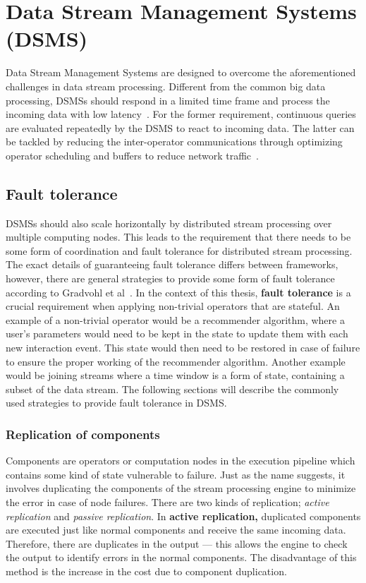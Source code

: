 \section{Data Stream Management Systems (DSMS)} 
Data Stream Management Systems are designed to overcome the aforementioned challenges 
in data stream processing. Different from the common big data processing, DSMSs should
respond in a limited time frame and process the incoming data with low latency~\cite{data_stream_management}. 
For the former requirement, continuous queries are evaluated repeatedly by the DSMS to react 
to incoming data. The latter can be tackled by reducing the inter-operator communications 
through optimizing operator scheduling and buffers to reduce network traffic~\cite{low_latency_data_stream}. 



\subsection{Fault tolerance}
DSMSs should also scale horizontally 
by distributed stream processing over multiple computing nodes. 
This leads to the requirement that there needs to be some form of coordination and fault tolerance 
for distributed stream processing. The exact details of guaranteeing fault tolerance differs between frameworks, however, there are general strategies to provide some 
form of fault tolerance according to Gradvohl et al~\cite{fault_tolerance_dsms}.
In the context of this thesis, \textbf{fault tolerance} is a crucial requirement when applying
non-trivial operators that are stateful. 
An example of a non-trivial operator would be a recommender algorithm, where 
a user's parameters would need to be kept in the state to update them with each new 
interaction event. This state would then need to be restored in case of failure to 
ensure the proper working of the recommender algorithm.
Another example would be joining streams where a time window is a form of state, 
containing a subset of the data stream. 
The following sections will describe the commonly used strategies to provide fault tolerance 
in DSMS. 

\subsubsection{Replication of components}
Components are operators or computation nodes in the execution pipeline which contains 
some kind of state vulnerable to failure. 
Just as the name suggests, it involves duplicating the components of the stream processing
engine to minimize the error in case of node failures. There are two kinds of replication; 
\emph{active replication} and \emph{passive replication}. In \textbf{active replication,}
duplicated components are executed just like normal components and receive the same incoming data. 
Therefore, there are duplicates in the output --- this allows the engine to check the 
output to identify errors in the normal components. The disadvantage of this method is 
the increase in the cost due to component duplication. 

